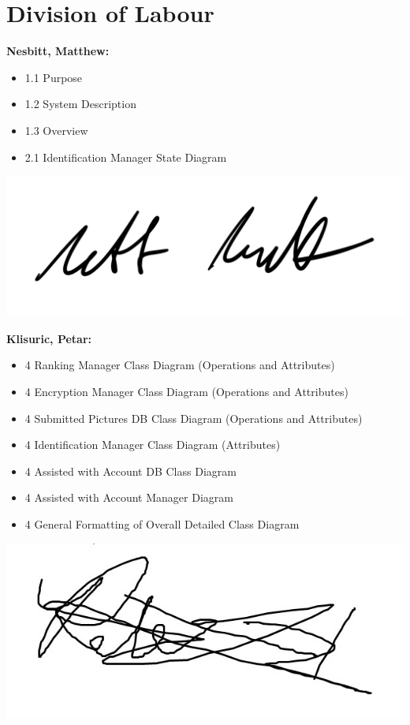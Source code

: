 \documentclass[]{article}
\begin{document}
\appendix
\section{Division of Labour}
\label{sec:division_of_labour}
\textbf{Nesbitt, Matthew:}
\begin{itemize}
	\item 1.1 Purpose
	\item 1.2 System Description
	\item 1.3 Overview
	\item 2.1 Identification Manager State Diagram
\end{itemize}
\includegraphics[scale=0.15]{mattsignature.jpg}

\textbf{Klisuric, Petar:}
\begin{itemize}
    \item 4 Ranking Manager Class Diagram (Operations and Attributes)
    \item 4 Encryption Manager Class Diagram (Operations and Attributes)
    \item 4 Submitted Pictures DB Class Diagram (Operations and Attributes)
    \item 4 Identification Manager Class Diagram (Attributes)
    \item 4 Assisted with Account DB Class Diagram
    \item 4 Assisted with Account Manager Diagram
    \item 4 General Formatting of Overall Detailed Class Diagram
\end{itemize}
\includegraphics[scale=0.15]{petarsignature.jpg}
\end{document}
